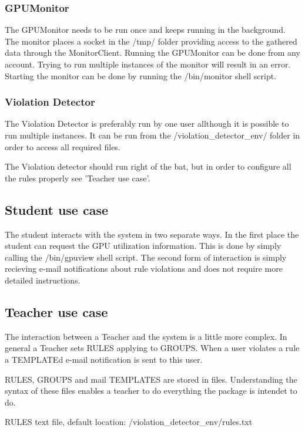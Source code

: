 \documentclass[10pt]{article}
\begin{document}
\subsubsection{GPUMonitor}
The GPUMonitor needs to be run once and keeps running in the background.
The monitor places a socket in the /tmp/ folder providing access to the
gathered data through the MonitorClient. Running the GPUMonitor can be 
done from any account. Trying to run multiple instances of the monitor 
will result in an error. Starting the monitor can be done by running the
/bin/monitor shell script.

\subsubsection{Violation Detector}
The Violation Detector is preferably run by one user allthough it is 
possible to run multiple instances. It can be run from the 
/violation\_detector\_env/ folder in order to access all required files.

The Violation detector should run right of the bat, but in order
to configure all the rules properly see 'Teacher use case'.
    
\subsection{Student use case}
        The student interacts with the system in two separate ways. In the
        first place the student can request the GPU utilization information.
        This is done by simply calling the /bin/gpuview shell script.
        The second form of interaction is simply recieving e-mail notifications
        about rule violations and does not require more detailed instructions. 

\subsection{Teacher use case}
The interaction between a Teacher and the system is a little more
complex. In general a Teacher sets RULES applying to GROUPS. When
a user violates a rule a TEMPLATEd e-mail notification is sent to 
this user. 

RULES, GROUPS and mail TEMPLATES are stored in files. Understanding
the syntax of these files enables a teacher to do everything the
package is intendet to do.

RULES
text file, default location: /violation\_detector\_env/rules.txt
\end{document}
